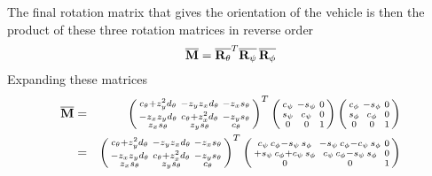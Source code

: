 \documentclass{article}
\def\matrix#1{\overline{\bf{#1}}}
\begin{document}
The final rotation matrix that gives the orientation of the vehicle is then the product of these three rotation matrices in reverse order
\begin{equation}
	\matrix{M} = \matrix{R_\theta}^T\matrix{R_\psi}\,\matrix{R_\phi}
\end{equation}
Expanding these matrices
\begin{eqnarray}
	\matrix{M} &=& 
	\begin{pmatrix}
		\begin{smallmatrix}
			c_\theta + z_y^2d_\theta &  -z_yz_xd_\theta & -z_xs_\theta \\
			-z_xz_yd_\theta & c_\theta + z_x^2d_\theta & - z_ys_\theta \\
			z_xs_\theta & z_ys_\theta & c_\theta
		\end{smallmatrix}
	\end{pmatrix}^T
	\begin{pmatrix}
	\begin{smallmatrix}
		c_\psi &  -s_\psi & 0 \\
		s_\psi & c_\psi & 0 \\
		0 & 0 & 1
	\end{smallmatrix}
	\end{pmatrix}
	\begin{pmatrix}
	\begin{smallmatrix}
		c_\phi &  -s_\phi & 0 \\
		s_\phi & c_\phi & 0 \\
		0 & 0 & 1
	\end{smallmatrix}
	\end{pmatrix}\\
	&=& 
	\begin{pmatrix}
		\begin{smallmatrix}
			c_\theta + z_y^2d_\theta &  -z_yz_xd_\theta & -z_xs_\theta \\
			-z_xz_yd_\theta & c_\theta + z_x^2d_\theta & - z_ys_\theta \\
			z_xs_\theta & z_ys_\theta & c_\theta
		\end{smallmatrix}
	\end{pmatrix}^T
	\begin{pmatrix}
	\begin{smallmatrix}
		c_\psi\,c_\phi-s_\psi\,s_\phi &  -s_\psi\,c_\phi -c_\psi\,s_\phi & 0 \\
		+s_\psi\,c_\phi +c_\psi\,s_\phi & c_\psi\,c_\phi-s_\psi\,s_\phi & 0 \\
		0 & 0 & 1
	\end{smallmatrix}
	\end{pmatrix}	
\end{eqnarray}
\end{document}

